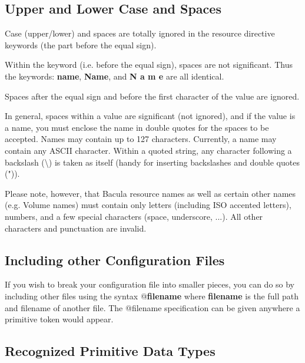 \subsection{Upper and Lower Case and Spaces}

Case (upper/lower) and spaces are totally ignored in the resource directive
keywords (the part before the equal sign). 

Within the keyword (i.e. before the equal sign), spaces are not significant.
Thus the keywords: {\bf name}, {\bf Name}, and {\bf N a m e} are all
identical. 

Spaces after the equal sign and before the first character of the value are
ignored. 

In general, spaces within a value are significant (not ignored), and if the
value is a name, you must enclose the name in double quotes for the spaces to
be accepted. Names may contain up to 127 characters. Currently, a name may
contain any ASCII character. Within a quoted string, any character following a
backslash (\textbackslash{}) is taken as itself (handy for inserting
backslashes and double quotes (")).

Please note, however, that Bacula resource names as well as certain other
names (e.g. Volume names) must contain only letters (including ISO accented
letters), numbers, and a few special characters (space, underscore, ...). 
All other characters and punctuation are invalid.

\label{Includes}
\subsection{Including other Configuration Files}

If you wish to break your configuration file into smaller pieces, you can do
so by including other files using the syntax @{\bf filename} where {\bf
filename} is the full path and filename of another file. The @filename
specification can be given anywhere a primitive token would appear.

\label{DataTypes}
\subsection{Recognized Primitive Data Types}

